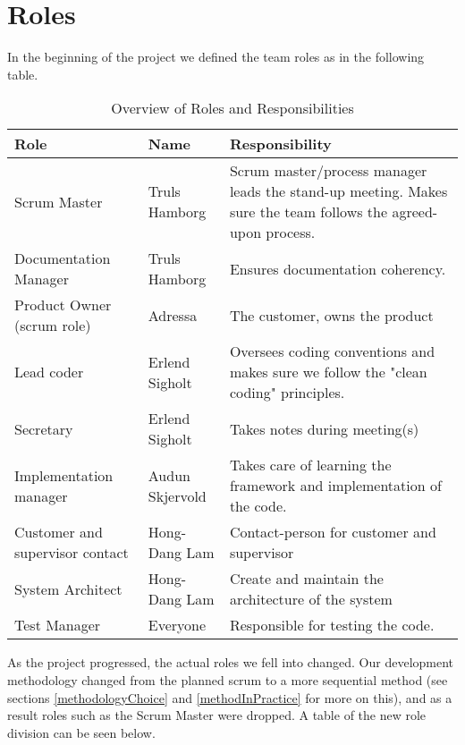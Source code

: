 \section{Roles}
In the beginning of the project we defined the team roles as in the following table.

\begin{table}[H]
  \begin{tabular}{|l|l|p{5cm}|}
    \hline
    \textbf{Role} & \textbf{Name} & \textbf{Responsibility}\\
    \hline 
    Scrum Master & Truls Hamborg &  Scrum master/process manager leads the stand-up meeting. Makes sure the team follows the agreed-upon process. \\ \hline
    Documentation Manager & Truls Hamborg &  Ensures documentation coherency. \\ \hline
    Product Owner (scrum role) & Adressa & The customer, owns the product\\ \hline
    Lead coder & Erlend Sigholt & Oversees coding conventions and makes sure we follow the "clean coding" principles. \\ \hline
    Secretary & Erlend Sigholt & Takes notes during meeting(s) \\ \hline
    Implementation manager & Audun Skjervold & Takes care of learning the framework and implementation of the code.\\ \hline
    Customer and supervisor contact & Hong-Dang Lam & Contact-person for customer and supervisor \\ \hline
    System Architect & Hong-Dang Lam & Create and maintain the architecture of the system \\
    \hline
    Test Manager & Everyone & Responsible for testing the code.\\
    \hline
  \end{tabular}
  \caption{Overview of Roles and Responsibilities}
  \end{table}
  
As the project progressed, the actual roles we fell into changed. Our development methodology changed from the planned scrum to a more sequential method (see sections \ref{methodologyChoice} and \ref{methodInPractice} for more on this), and as a result roles such as the Scrum Master were dropped. A table of the new role division can be seen below.

